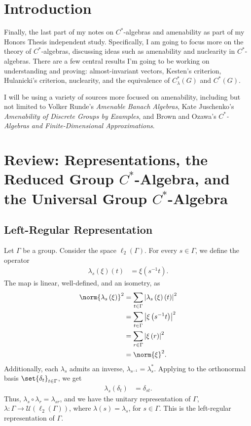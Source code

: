 \documentclass[10pt]{mypackage}
\begin{document}
\RaggedRight
\tableofcontents
\section{Introduction}%
Finally, the last part of my notes on $C^{\ast}$-algebras and amenability as part of my Honors Thesis independent study. Specifically, I am going to focus more on the theory of $C^{\ast}$-algebras, discussing ideas such as amenability and nuclearity in $C^{\ast}$-algebras. There are a few central results I'm going to be working on understanding and proving: almost-invariant vectors, Kesten's criterion, Hulanicki's criterion, nuclearity, and the equivalence of $C^{\ast}_{\lambda}\left(G\right)$ and $C^{\ast}\left(G\right)$.\newline

I will be using a variety of sources more focused on amenability, including but not limited to Volker Runde's \textit{Amenable Banach Algebras}, Kate Juschenko's \textit{Amenability of Discrete Groups by Examples}, and Brown and Ozawa's \textit{$C^{\ast}$-Algebras and Finite-Dimensional Approximations}.
\section{Review: Representations, the Reduced Group $C^{\ast}$-Algebra, and the Universal Group $C^{\ast}$-Algebra}%
\subsection{Left-Regular Representation}%
Let $\Gamma$ be a group. Consider the space $\ell_2\left(\Gamma\right)$. For every $s\in\Gamma$, we define the operator
\begin{align*}
  \lambda_s\left(\xi\right)\left(t\right) &= \xi\left(s^{-1}t\right).
\end{align*}
The map is linear, well-defined, and an isometry, as
\begin{align*}
  \norm{\lambda_s\left(\xi\right)}^2 &= \sum_{t\in\Gamma}\left\vert \lambda_s\left(\xi\right)\left(t\right) \right\vert^2\\
                                     &= \sum_{t\in\Gamma}\left\vert \xi\left(s^{-1}t\right) \right\vert^2\\
                                     &= \sum_{r\in\Gamma}\left\vert \xi\left(r\right) \right\vert^2\\
                                     &= \norm{\xi}^2.
\end{align*}
Additionally, each $\lambda_{s}$ admits an inverse, $\lambda_{s^{-1}} = \lambda_s^{\ast}$. Applying to the orthonormal basis $\set{\delta_t}_{t\in\Gamma}$, we get
\begin{align*}
  \lambda_s\left(\delta_t\right) &= \delta_{st}.
\end{align*}
Thus, $\lambda_{s}\circ \lambda_r = \lambda_{sr}$, and we have the unitary representation of $\Gamma$, $\lambda\colon \Gamma\rightarrow \mathcal{U}\left(\ell_2\left(\Gamma\right)\right)$, where $\lambda(s) = \lambda_s$, for $s\in \Gamma$. This is the left-regular representation of $\Gamma$.\newline
 
\end{document}
